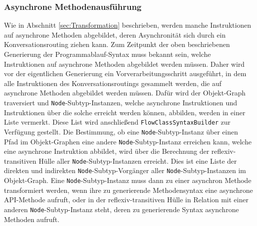 \subsubsection{Asynchrone Methodenausführung}
\label{subsubsec:Nebenlaeufigkeit}
Wie in Abschnitt \ref{sec:Transformation} beschrieben, werden manche Instruktionen auf asynchrone Methoden abgebildet, deren Asynchronität sich durch ein Konversationsrouting ziehen kann. Zum Zeitpunkt der oben beschriebenen Generierung der Pro\-gramm\-ab\-lauf-Syntax muss bekannt sein, welche Instruktionen auf asynchrone Methoden abgebildet werden müssen. Daher wird vor der eigentlichen Generierung ein Vorverarbeitungsschritt ausgeführt, in dem alle Instruktionen des Konversationsroutings gesammelt werden, die auf asynchrone Methoden abgebildet werden müssen. Dafür wird der Objekt-Graph traversiert und \texttt{Node}-Subtyp-Instanzen, welche asynchrone Instruktionen und Instruktionen über die solche erreicht werden können, abbilden, werden in einer Liste vermerkt. Diese List wird anschließend \texttt{FlowClassSyntaxBuilder} zur Verfügung gestellt. Die Bestimmung, ob eine \texttt{Node}-Subtyp-Instanz über einen Pfad im Objekt-Graphen eine andere \texttt{Node}-Subtyp-Instanz erreichen kann, welche eine asynchrone Instruktion abbildet, wird über die Berechnung der reflexiv-transitiven Hülle aller \texttt{Node}-Subtyp-Instanzen erreicht. Dies ist eine Liste der direkten und indirekten \texttt{Node}-Subtyp-Vorgänger aller \texttt{Node}-Subtyp-Instanzen im Objekt-Graph. Eine \texttt{Node}-Subtyp-Instanz muss dann zu einer asynchron Methode transformiert werden, wenn ihre zu generierende Methodensyntax eine asynchrone API-Methode aufruft, oder in der reflexiv-transitiven Hülle in Relation mit einer anderen \texttt{Node}-Subtyp-Instanz steht, deren zu generierende Syntax asynchrone Methoden aufruft.

